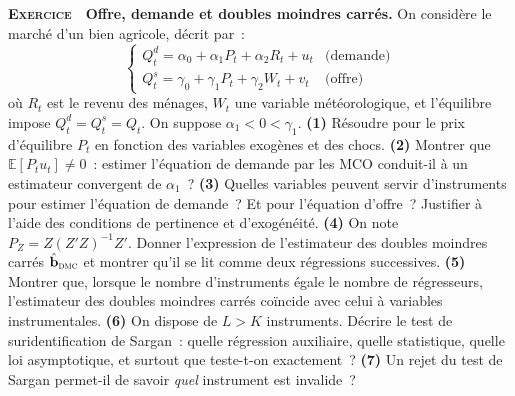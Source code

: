 \documentclass[10pt,a4paper,notitlepage]{article}
\newcounter{xnumber}
\newcommand{\exercice}{\refstepcounter{xnumber}\textsc{\textbf{Exercice}} \textbf{\thexnumber}\,\,}
\newcommand{\question}[1]{\textbf{(#1)}}
\begin{document}
\bigskip

\exercice\label{ex:offre-demande} \textbf{Offre, demande et doubles moindres carrés.} On considère le
marché d'un bien agricole, décrit par~:
\[
  \begin{cases}
    Q_t^{d} = \alpha_0 + \alpha_1 P_t + \alpha_2 R_t + u_t & \text{(demande)}\\
    Q_t^{s} = \gamma_0 + \gamma_1 P_t + \gamma_2 W_t + v_t & \text{(offre)}
  \end{cases}
\]
où $R_t$ est le revenu des ménages, $W_t$ une variable météorologique, et
l'équilibre impose $Q_t^d = Q_t^s = Q_t$. On suppose $\alpha_1<0<\gamma_1$.
\question{1} Résoudre pour le prix d'équilibre $P_t$ en fonction des variables
exogènes et des chocs. \question{2} Montrer que
$\mathbb E[P_t u_t]\neq 0$~: estimer l'équation de demande par les MCO
conduit-il à un estimateur convergent de $\alpha_1$~? \question{3} Quelles
variables peuvent servir d'instruments pour estimer l'équation de demande~? Et
pour l'équation d'offre~? Justifier à l'aide des conditions de pertinence et
d'exogénéité. \question{4} On note $P_Z = Z(Z'Z)^{-1}Z'$. Donner l'expression de
l'estimateur des doubles moindres carrés $\hat{\mathbf b}_{\textsc{dmc}}$ et
montrer qu'il se lit comme deux régressions successives. \question{5} Montrer
que, lorsque le nombre d'instruments égale le nombre de régresseurs,
l'estimateur des doubles moindres carrés coïncide avec celui à variables
instrumentales. \question{6} On dispose de $L>K$ instruments. Décrire le test de
suridentification de Sargan~: quelle régression auxiliaire, quelle statistique,
quelle loi asymptotique, et surtout que teste-t-on exactement~? \question{7} Un
rejet du test de Sargan permet-il de savoir \emph{quel} instrument est
invalide~?\newline

\bigskip
\end{document}

